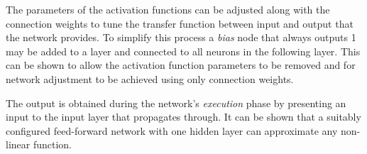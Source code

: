 The parameters of the activation functions can be adjusted along with the
connection weights to tune the transfer function between input and output that
the network provides.  To simplify this process a \textit{bias} node that always outputs 1
may be added to a layer and connected to all neurons in the following layer.
This can be shown to allow the activation function parameters to be removed and
for network adjustment to be achieved using only connection weights.

The output is obtained during the network's \textit{execution} phase by
presenting an input to the input layer that propagates through.  It can be
shown that a suitably configured feed-forward network with one hidden layer can
approximate any non-linear function.

